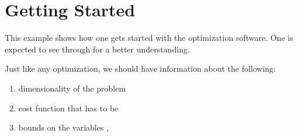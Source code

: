 \documentclass[letterpaper,12pt,english]{sphinxmanual}
\begin{document}
\section{Getting Started}
\label{\detokenize{examples/getting_started_example:getting-started}}\label{\detokenize{examples/getting_started_example:example-0}}\label{\detokenize{examples/getting_started_example::doc}}
\sphinxAtStartPar
This example shows how one gets started with the optimization software.
One is expected to see through  for a better understanding.

\sphinxAtStartPar
Just like any optimization, we should have information about the following:
\begin{enumerate}
%
\item {} 
\sphinxAtStartPar
dimensionality of the problem \textendash{} 

\item {} 
\sphinxAtStartPar
cost function that has to be  \textendash{} 

\item {} 
\sphinxAtStartPar
bounds on the variables   \textendash{} , 

\end{enumerate}
\end{document}
